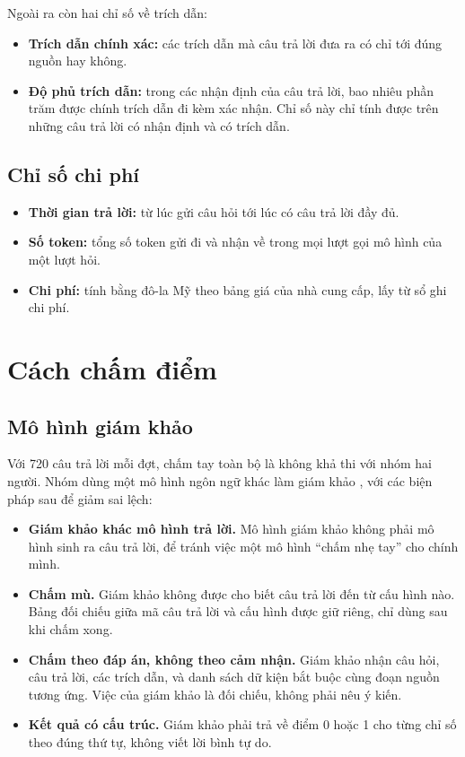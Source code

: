 Ngoài ra còn hai chỉ số về trích dẫn:

\begin{itemize}
    \item \textbf{Trích dẫn chính xác:} các trích dẫn mà câu trả lời đưa ra có chỉ tới đúng nguồn hay không.
    \item \textbf{Độ phủ trích dẫn:} trong các nhận định của câu trả lời, bao nhiêu phần trăm được chính trích dẫn đi kèm xác nhận. Chỉ số này chỉ tính được trên những câu trả lời có nhận định và có trích dẫn.
\end{itemize}

\subsection{Chỉ số chi phí}

\begin{itemize}
    \item \textbf{Thời gian trả lời:} từ lúc gửi câu hỏi tới lúc có câu trả lời đầy đủ.
    \item \textbf{Số token:} tổng số token gửi đi và nhận về trong mọi lượt gọi mô hình của một lượt hỏi.
    \item \textbf{Chi phí:} tính bằng đô-la Mỹ theo bảng giá của nhà cung cấp, lấy từ sổ ghi chi phí.
\end{itemize}

\section{Cách chấm điểm}

\subsection{Mô hình giám khảo}

Với 720 câu trả lời mỗi đợt, chấm tay toàn bộ là không khả thi với nhóm hai người. Nhóm dùng một mô hình ngôn ngữ khác làm giám khảo , với các biện pháp sau để giảm sai lệch:

\begin{itemize}
    \item \textbf{Giám khảo khác mô hình trả lời.} Mô hình giám khảo không phải mô hình sinh ra câu trả lời, để tránh việc một mô hình ``chấm nhẹ tay'' cho chính mình.
    \item \textbf{Chấm mù.} Giám khảo không được cho biết câu trả lời đến từ cấu hình nào. Bảng đối chiếu giữa mã câu trả lời và cấu hình được giữ riêng, chỉ dùng sau khi chấm xong.
    \item \textbf{Chấm theo đáp án, không theo cảm nhận.} Giám khảo nhận câu hỏi, câu trả lời, các trích dẫn, và danh sách dữ kiện bắt buộc cùng đoạn nguồn tương ứng. Việc của giám khảo là đối chiếu, không phải nêu ý kiến.
    \item \textbf{Kết quả có cấu trúc.} Giám khảo phải trả về điểm 0 hoặc 1 cho từng chỉ số theo đúng thứ tự, không viết lời bình tự do.
\end{itemize}

